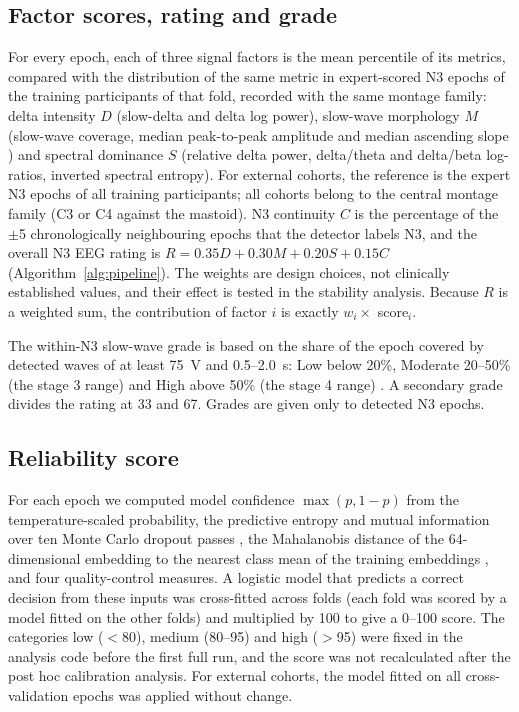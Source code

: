 \subsection{Factor scores, rating and grade}
For every epoch, each of three signal factors is the mean percentile of its metrics, compared with the distribution of the same metric in expert-scored N3 epochs of the training participants of that fold, recorded with the same montage family: delta intensity $D$ (slow-delta and delta log power), slow-wave morphology $M$ (slow-wave coverage, median peak-to-peak amplitude and median ascending slope \cite{riedner2007slowwaves}) and spectral dominance $S$ (relative delta power, delta/theta and delta/beta log-ratios, inverted spectral entropy). For external cohorts, the reference is the expert N3 epochs of all training participants; all cohorts belong to the central montage family (C3 or C4 against the mastoid). N3 continuity $C$ is the percentage of the $\pm$5 chronologically neighbouring epochs that the detector labels N3, and the overall N3 EEG rating is $R = 0.35D + 0.30M + 0.20S + 0.15C$ (Algorithm~\ref{alg:pipeline}). The weights are design choices, not clinically established values, and their effect is tested in the stability analysis. Because $R$ is a weighted sum, the contribution of factor $i$ is exactly $w_i \times$ score$_i$.

The within-N3 slow-wave grade is based on the share of the epoch covered by detected waves of at least 75~\textmu V and 0.5--2.0~s: Low below 20\%, Moderate 20--50\% (the stage 3 range) and High above 50\% (the stage 4 range) \cite{rechtschaffen1968manual}. A secondary grade divides the rating at 33 and 67. Grades are given only to detected N3 epochs.

\subsection{Reliability score}
For each epoch we computed model confidence $\max(p, 1-p)$ from the temperature-scaled probability, the predictive entropy and mutual information over ten Monte Carlo dropout passes \cite{gal2016dropout}, the Mahalanobis distance of the 64-dimensional embedding to the nearest class mean of the training embeddings \cite{lee2018mahalanobis}, and four quality-control measures. A logistic model that predicts a correct decision from these inputs was cross-fitted across folds (each fold was scored by a model fitted on the other folds) and multiplied by 100 to give a 0--100 score. The categories low ($<$80), medium (80--95) and high ($>$95) were fixed in the analysis code before the first full run, and the score was not recalculated after the post hoc calibration analysis. For external cohorts, the model fitted on all cross-validation epochs was applied without change.

